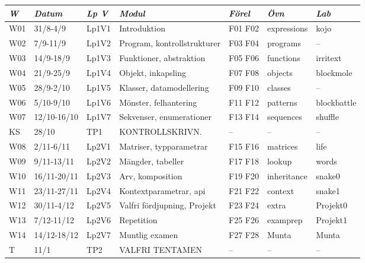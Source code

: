 \begin{tabular}{l|l|l|l|l|l|l}
\textit{W} & \textit{Datum} & \textit{Lp V} & \textit{Modul} & \textit{Förel} & \textit{Övn} & \textit{Lab} \\ \hline \hline
W01 & 31/8-4/9 & Lp1V1 & Introduktion & F01 F02 & expressions & kojo \\
W02 & 7/9-11/9 & Lp1V2 & Program, kontrollstrukturer & F03 F04 & programs & -- \\
W03 & 14/9-18/9 & Lp1V3 & Funktioner, abstraktion & F05 F06 & functions & irritext \\
W04 & 21/9-25/9 & Lp1V4 & Objekt, inkapsling & F07 F08 & objects & blockmole \\
W05 & 28/9-2/10 & Lp1V5 & Klasser, datamodellering & F09 F10 & classes & -- \\
W06 & 5/10-9/10 & Lp1V6 & Mönster, felhantering & F11 F12 & patterns & blockbattle \\
W07 & 12/10-16/10 & Lp1V7 & Sekvenser, enumerationer & F13 F14 & sequences & shuffle \\
KS & 28/10 & TP1 & KONTROLLSKRIVN. & -- & -- & -- \\
W08 & 2/11-6/11 & Lp2V1 & Matriser, typparametrar & F15 F16 & matrices & life \\
W09 & 9/11-13/11 & Lp2V2 & Mängder, tabeller & F17 F18 & lookup & words \\
W10 & 16/11-20/11 & Lp2V3 & Arv, komposition & F19 F20 & inheritance & snake0 \\
W11 & 23/11-27/11 & Lp2V4 & Kontextparametrar, api & F21 F22 & context & snake1 \\
W12 & 30/11-4/12 & Lp2V5 & Valfri fördjupning, Projekt & F23 F24 & extra & Projekt0 \\
W13 & 7/12-11/12 & Lp2V6 & Repetition & F25 F26 & examprep & Projekt1 \\
W14 & 14/12-18/12 & Lp2V7 & Muntlig examen & F27 F28 & Munta & Munta \\
T & 11/1 & TP2 & VALFRI TENTAMEN & -- & -- & -- \\
\end{tabular}
